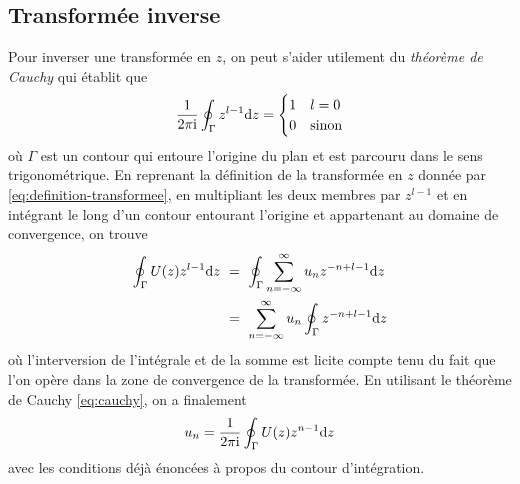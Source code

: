\subsection{Transformée inverse}
Pour inverser une transform\'{e}e en $z$, on peut s'aider utilement du \emph{théorème de Cauchy} qui \'{e}tablit que
\begin{equation}
\label{eq:cauchy}
\frac{1}{2\pi \mathrm{i}}\oint_{\Gamma}z^{l-1}\mathrm{d}  z= \begin{cases} 1 & l= 0 \\ 0 & \text{sinon} \end{cases}
\end{equation}
o\`{u} $\Gamma$ est un contour qui entoure l'origine du plan et est parcouru dans le sens trigonométrique. En reprenant la d\'{e}finition de la transform\'{e}e en $z$ donn\'{e}e par \eqref{eq:definition-transformee}, en multipliant les deux membres par $z^{l-1}$ et en int\'{e}grant le long d'un contour entourant l'origine et appartenant au domaine de convergence, on trouve
\begin{align*}
\oint_{\Gamma}U(z)z^{l-1}\rmd z\ &=\ \oint_{\Gamma}\sum_{n=-\infty}^{\infty} u_n z^{-n+l-1}\rmd z \\
&=\ \sum_{n=-\infty}^{\infty} u_n \oint_{\Gamma}z^{-n+l-1}\rmd z
\end{align*}
o\`{u} l'interversion de l'int\'{e}grale et de la somme est licite compte tenu du fait que l'on op\`{e}re dans la zone de convergence de la transform\'{e}e. En utilisant le th\'{e}or\`{e}me de Cauchy \eqref{eq:cauchy}, on a finalement
\begin{equation}
\label{eq:inverse-z}
u_n=\frac{1}{2\pi \mathrm{i}}\oint_{\Gamma} U(z)z^{n-1}\mathrm{d} z
\end{equation}
avec les conditions d\'{e}j\`{a} \'{e}nonc\'{e}es \`{a} propos du contour d'int\'{e}gration.


